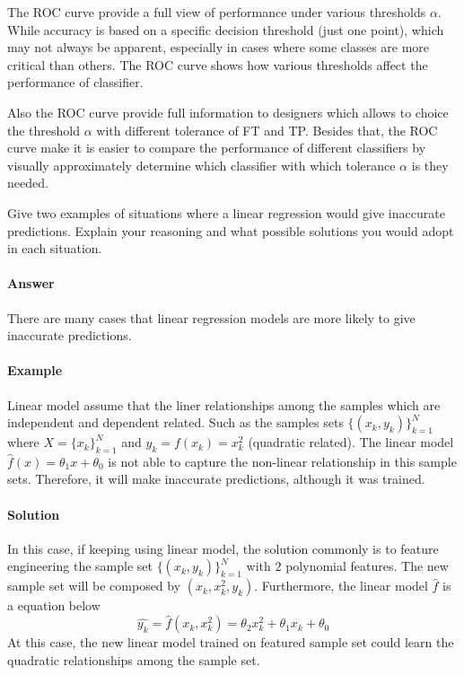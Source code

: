 The ROC curve provide a full view of performance under various thresholds $\alpha$.
While accuracy is based on a specific decision threshold (just one point), 
which may not always be apparent, 
especially in cases where some classes are more critical than others. 
The ROC curve shows how various thresholds affect the performance of classifier.

Also the ROC curve provide full information to designers which allows to 
choice the threshold $\alpha$ with different tolerance of FT and TP.
Besides that, the ROC curve make it is easier to compare the performance of 
different classifiers by visually approximately determine which classifier 
with which tolerance $\alpha$ is they needed.

\vspace{1em}
\thequestion Give two examples of situations where a linear regression would give inaccurate
predictions. Explain your reasoning and what possible solutions you would adopt in each
situation.

\paragraph*{Answer}
There are many cases that linear regression models are more likely to give inaccurate
predictions.
\paragraph{Example}
Linear model assume that the liner relationships among the samples which
are independent and dependent related. 
Such as the samples sets $\{(x_{k}, y_k)\}_{k=1}^{N}$ where 
$X = \{x_k\}_{k=1}^{N}$ and $y_{k} = f(x_k) = x_k^2$ (quadratic related).
The linear model $\widehat{f}(x) = \theta_1 x + \theta_0$ is not able to capture the non-linear relationship in this 
sample sets.
Therefore, it will make inaccurate predictions, although it was trained.
\paragraph{Solution}
In this case, if keeping using linear model, the solution commonly is to 
feature engineering the sample set $\{(x_{k}, y_k)\}_{k=1}^{N}$ with $2$ polynomial features.
The new sample set will be composed by $(x_{k}, x^2_{k}, y_k)$. 
Furthermore, the linear model $\widehat{f}$ is a equation below
\[
    \widehat{y_k} = \widehat{f}(x_{k}, x^2_{k}) 
    = \theta_2 x_k^2 + \theta_1 x_k + \theta_0
\]
At this case, the new linear model trained on featured sample set could learn the quadratic
relationships among the sample set.

